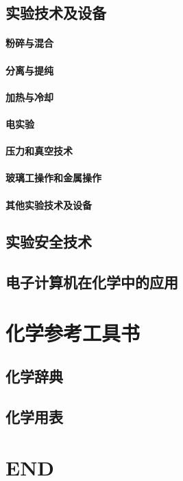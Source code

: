 \documentclass[UTF8]{../03-Chemistry}
\begin{document}
\section{实验技术及设备}
    \subsubsection{粉碎与混合}
    \subsubsection{分离与提纯}
    \subsubsection{加热与冷却}
    \subsubsection{电实验}
    \subsubsection{压力和真空技术}
    \subsubsection{玻璃工操作和金属操作}
    \subsubsection{其他实验技术及设备}
\section{实验安全技术}
\section{电子计算机在化学中的应用}



\chapter{化学参考工具书}
\section{化学辞典}
\section{化学用表}


\chapter{END}
\end{document}

